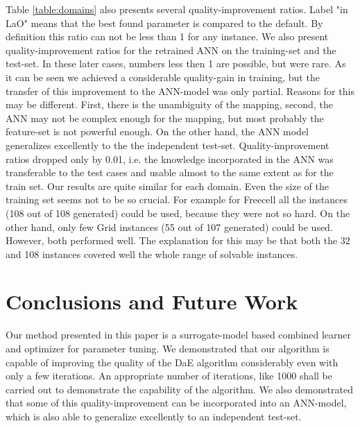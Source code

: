 \documentclass[letterpaper]{article}
\begin{document}
Table \ref{table:domains} also presents several quality-improvement ratios. Label "in LaO" means that the best found parameter is compared to the default. By definition this ratio can not be less than 1 for any instance. We also present quality-improvement ratios for the retrained ANN on the training-set and the test-set. In these later cases, numbers less then 1 are possible, but were rare. As it can be seen we achieved a considerable quality-gain in training, but the transfer of this improvement to the ANN-model was only partial. Reasons for this may be different. First, there is the unambiguity of the mapping, second, the ANN may not be complex enough for the mapping, but most probably the feature-set is not powerful enough. On the other hand, the ANN model generalizes excellently to the the independent test-set. Quality-improvement ratios dropped only by 0.01, i.e. the knowledge incorporated in the ANN was transferable to the test cases and usable almost to the same extent as for the train set. Our results are quite similar for each domain. Even the size of the training set seems not to be so crucial. For example for Freecell all the instances (108 out of 108 generated) could be used, because they were not so hard. On the other hand, only few  Grid instances (55 out of 107 generated) could be used. However, both performed well. The explanation for this may be that both the 32 and 108 instances covered well the whole range of solvable instances.

\section{Conclusions and Future Work}
\label{section:conclusions}
\label{section:futurework}	

Our method presented in this paper is a surrogate-model based combined learner and optimizer for parameter tuning. We demonstrated that our algorithm is capable of improving the quality of the DaE algorithm considerably even with only a few iterations. An appropriate number of iterations, like 1000 shall be carried out to demonstrate the capability of the algorithm. We also demonstrated that some of this quality-improvement can be incorporated into an ANN-model, which is also able to generalize excellently to an independent test-set.
\end{document}
